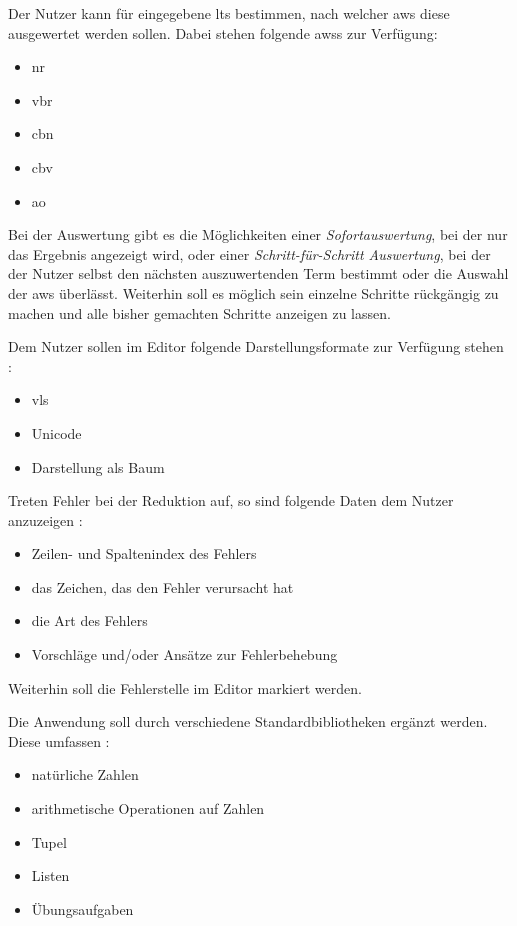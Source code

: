 \documentclass[parskip=full,11pt,twoside]{scrartcl}
\begin{document}
Der Nutzer kann für eingegebene \glspl{lt} bestimmen, nach welcher \gls{aws} diese ausgewertet werden sollen. Dabei stehen folgende \glspl{aws} zur Verfügung:
\begin{itemize}
\item \gls{nr}
\item \gls{vbr}
\item \gls{cbn}
\item \gls{cbv}
\item \gls{ao}
\end{itemize}
Bei der Auswertung gibt es die Möglichkeiten einer \emph{Sofortauswertung}, bei der nur das Ergebnis angezeigt wird, oder einer \emph{Schritt-für-Schritt Auswertung}, bei der der Nutzer selbst den nächsten auszuwertenden Term bestimmt oder die Auswahl der \gls{aws} überlässt. Weiterhin soll es möglich sein einzelne Schritte rückgängig zu machen und alle bisher gemachten Schritte anzeigen zu lassen.

Dem Nutzer sollen im Editor folgende Darstellungsformate zur Verfügung stehen : 
\begin{itemize}
\item \gls{vls}
\item Unicode
\item Darstellung als Baum
\end{itemize}

Treten Fehler bei der Reduktion auf, so sind folgende Daten dem Nutzer anzuzeigen : 
\begin{itemize}
\item Zeilen- und Spaltenindex des Fehlers
\item das Zeichen, das den Fehler verursacht hat
\item die Art des Fehlers
\item Vorschläge und/oder Ansätze zur Fehlerbehebung
\end{itemize}
Weiterhin soll die Fehlerstelle im Editor markiert werden.

Die Anwendung soll durch verschiedene Standardbibliotheken ergänzt werden. Diese umfassen : 
\begin{itemize}
\item natürliche Zahlen
\item arithmetische Operationen auf Zahlen
\item Tupel
\item Listen
\item Übungsaufgaben
\end{itemize}
\end{document}

